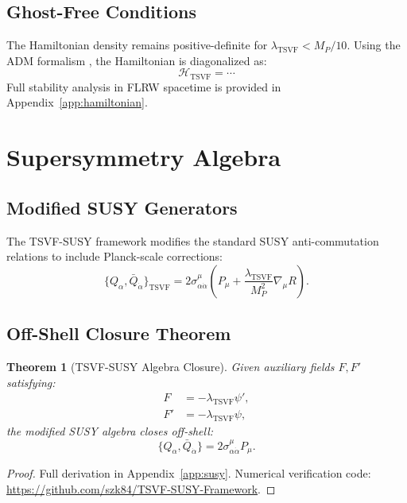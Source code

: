 \documentclass[twocolumn,superscriptaddress,floatfix]{revtex4-2}
\newtheorem{theorem}{Theorem}
\newcommand{\tsvf}{\lambda_{\text{TSVF}}}
\begin{document}
\subsection{Ghost-Free Conditions}  
The Hamiltonian density remains positive-definite for \(\lambda_{\text{TSVF}} < M_P/10\). Using the ADM formalism \cite{Ashtekar2004}, the Hamiltonian is diagonalized as:  
\begin{equation}  
\mathcal{H}_{\text{TSVF}} = \cdots  
\label{eq:hamiltonian}  
\end{equation}  
Full stability analysis in FLRW spacetime is provided in Appendix~\ref{app:hamiltonian}. 

\section{Supersymmetry Algebra}  
\label{sec:susy}    

\subsection{Modified SUSY Generators}  
\label{subsec:susy_generators}   

The TSVF-SUSY framework modifies the standard SUSY anti-commutation relations to include Planck-scale corrections:  
\begin{equation}  
\{Q_{\alpha}, \bar{Q}_{\dot{\alpha}}\}_{\text{TSVF}} = 2\sigma^{\mu}_{\alpha\dot{\alpha}}\left(P_{\mu} + \frac{\lambda_{\text{TSVF}}}{M_P^2}\nabla_{\mu}R\right).  
\label{eq:susy_anticommutator}   
\end{equation}  

\subsection{Off-Shell Closure Theorem}  
\begin{theorem}[TSVF-SUSY Algebra Closure]  
Given auxiliary fields \(F, F'\) satisfying:  
\begin{align}  
F &= -\tsvf \psi', \\  
F' &= -\tsvf \psi,  
\end{align}  
the modified SUSY algebra closes off-shell:  
\begin{equation}  
\{Q_\alpha, \bar{Q}_{\dot{\alpha}}\} = 2\sigma^\mu_{\alpha\dot{\alpha}}P_\mu.  
\end{equation}  
\end{theorem}  
\begin{proof}  
Full derivation in Appendix~\ref{app:susy}. Numerical verification code: \url{https://github.com/szk84/TSVF-SUSY-Framework}.  
\end{proof}
\end{document}
